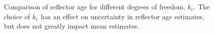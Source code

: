 \begin{figure}[ht]
\begin{center}
{}
\caption[scale=0.3]{Comparison of reflector age for different degrees of freedom, $k_e$. The choice of $k_e$ has an effect on uncertainty in reflector age estimates, but does not greatly impact mean estimates. }
\end{center}
\label{fig:ke}
\end{figure}



%

%


